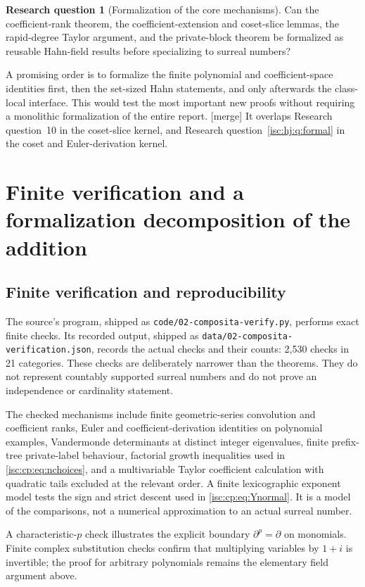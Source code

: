 \documentclass[11pt,letterpaper]{article}
\theoremstyle{definition}
\newtheorem{question}{Research question}
\theoremstyle{remark}
\newcommand{\rpath}[1]{\nolinkurl{#1}}%
\newcommand{\mtag}{\textup{[merge]}}%
\numberwithin{equation}{section}
\begin{document}
\begin{question}[Formalization of the core mechanisms]\label{isc:cp:q:formal}
Can the coefficient-rank theorem, the coefficient-extension and coset-slice
lemmas, the rapid-degree Taylor argument, and the private-block theorem be
formalized as reusable Hahn-field results before specializing to surreal
numbers?
\end{question}
A promising order is to formalize the finite polynomial and
coefficient-space identities first, then the set-sized Hahn statements, and
only afterwards the class-local interface. This would test the most
important new proofs without requiring a monolithic formalization of the
entire report. \mtag{} It overlaps Research question~10 in the coset-slice
kernel, and Research question~\ref{isc:hj:q:formal} in the coset and
Euler-derivation kernel.

\section{Finite verification and a formalization decomposition of the addition}
\label{isc:cp:sec:verify}

\subsection{Finite verification and reproducibility}

The source's program, shipped as \rpath{code/02-composita-verify.py},
performs exact finite checks. Its recorded output, shipped as
\rpath{data/02-composita-verification.json}, records the actual checks and
their counts: 2,530 checks in 21 categories. These checks are deliberately
narrower than the theorems. They do not represent countably supported
surreal numbers and do not prove an independence or cardinality statement.

The checked mechanisms include finite geometric-series convolution and
coefficient ranks, Euler and coefficient-derivation identities on
polynomial examples, Vandermonde determinants at distinct integer
eigenvalues, finite prefix-tree private-label behaviour, factorial growth
inequalities used in \eqref{isc:cp:eq:nchoices}, and a multivariable Taylor
coefficient calculation with quadratic tails excluded at the relevant
order. A finite lexicographic exponent model tests the sign and strict
descent used in \eqref{isc:cp:eq:Ynormal}. It is a model of the comparisons,
not a numerical approximation to an actual surreal number.

A characteristic-$p$ check illustrates the explicit boundary
$\partial^p=\partial$ on monomials. Finite complex substitution checks
confirm that multiplying variables by $1+i$ is invertible; the proof for
arbitrary polynomials remains the elementary field argument above.
\end{document}
